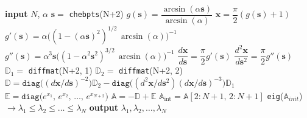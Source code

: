 \documentclass[11pt,a4paper,oneside,openright]{report} %
\begin{document}
\begin{algorithm}[H]
\caption{Mapped Barycentric Chebyshev Differentiation Matrix - Paine equation}
\label{alg_MBCDM_Paine}
{\small
\begin{algorithmic}[1]
\State \textbf{input} $N$, $\alpha$
\State $\boldsymbol{s} =$ \texttt{chebpts}(N+2)
\State $g(\boldsymbol{s}) = \dfrac{\arcsin(\alpha \boldsymbol{s})}{\arcsin(\alpha)}$ 
\State $\boldsymbol{x} = \dfrac{\pi}{2} (g(\boldsymbol{s}) + 1)$
\BlankLine
\State $g'(\boldsymbol{s}) = \alpha \big((1-(\alpha \boldsymbol{s})^2)^{1/2} \, \arcsin(\alpha) \big)^{-1}$
\State $g''(\boldsymbol{s}) = \alpha^3 \boldsymbol{s} \big((1-\alpha^2 \boldsymbol{s}^2)^{3/2} \, \arcsin(\alpha) \big)^{-1}$
\BlankLine
\State $\dfrac{d\boldsymbol{x}}{d\boldsymbol{s}} = \dfrac{\pi}{2} g'(\boldsymbol{s})$
\State $\dfrac{d^2 \boldsymbol{x}}{d\boldsymbol{s}^2} = \dfrac{\pi}{2} g''(\boldsymbol{s})$
\BlankLine
\State $\mathbb{D}_1 =$ \texttt{diffmat}(N+2, 1)
\State $\mathbb{D}_2 = $ \texttt{diffmat}(N+2, 2) 
\BlankLine
\State $\mathbb{D} = \texttt{diag}\big((d\boldsymbol{x}/d\boldsymbol{s})^{-2}\big) \mathbb{D}_2 - \texttt{diag}\big((d^2\boldsymbol{x}/d\boldsymbol{s}^2)(d\boldsymbol{x}/d\boldsymbol{s})^{-3}\big) \mathbb{D}_1$
\State $\mathbb{E} = \texttt{diag}\big(e^{x_1}, \, e^{x_2}, \, \dots, \, e^{x_{N+2}}\big)$
\State $\mathbb{A} = -\mathbb{D} + \mathbb{E}$
\State $\mathbb{A}_{\text{int}} = \mathbb{A}[2:N+1, \, 2:N+1]$
\BlankLine
\State \texttt{eig}($\mathbb{A}_{init}$) $ \to \lambda_1 \leq \lambda_2 \leq \dots \leq \lambda_N$
\State \textbf{output} $\lambda_1, \lambda_2, \dots, \lambda_N$
\end{algorithmic}
}
\end{algorithm}
\end{document}
